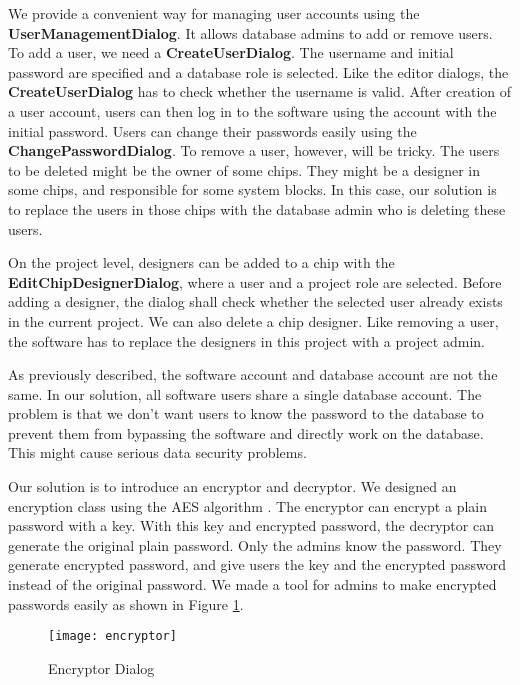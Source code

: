 We provide a convenient way for managing user accounts using the \textbf{UserManagementDialog}. It allows database admins to add or remove users. To add a user, we need a \textbf{CreateUserDialog}. The username and initial password are specified and a database role is selected. Like the editor dialogs, the \textbf{CreateUserDialog} has to check whether the username is valid. After creation of a user account, users can then log in to the software using the account with the initial password. Users can change their passwords easily using the \textbf{ChangePasswordDialog}. To remove a user, however, will be tricky. The users to be deleted might be the owner of some chips. They might be a designer in some chips, and responsible for some system blocks. In this case, our solution is to replace the users in those chips with the database admin who is deleting these users.

On the project level, designers can be added to a chip with the \textbf{EditChipDesignerDialog}, where a user and a project role are selected. Before adding a designer, the dialog shall check whether the selected user already exists in the current project. We can also delete a chip designer. Like removing a user, the software has to replace the designers in this project with a project admin.

As previously described, the software account and database account are not the same. In our solution, all software users share a single database account. The problem is that we don't want users to know the password to the database to prevent them from bypassing the software and directly work on the database. This might cause serious data security problems.

Our solution is to introduce an encryptor and decryptor. We designed an encryption class using the AES algorithm \cite{daemen2013design}. The encryptor can encrypt a plain password with a key. With this key and encrypted password, the decryptor can generate the original plain password. Only the admins know the password. They generate encrypted password, and give users the key and the encrypted password instead of the original password. We made a tool for admins to make encrypted passwords easily as shown in Figure \ref{fig:Encryptor Dialog}.

\begin{figure}[htb]
\centering
\texttt{[image: encryptor]}
\caption{Encryptor Dialog\label{fig:Encryptor Dialog}}
\end{figure} 

